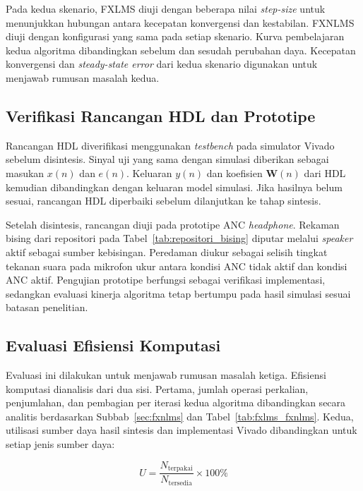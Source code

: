 Pada kedua skenario, FXLMS diuji dengan beberapa nilai \emph{step-size} untuk menunjukkan hubungan antara kecepatan konvergensi dan kestabilan. FXNLMS diuji dengan konfigurasi yang sama pada setiap skenario. Kurva pembelajaran kedua algoritma dibandingkan sebelum dan sesudah perubahan daya. Kecepatan konvergensi dan \emph{steady-state error} dari kedua skenario digunakan untuk menjawab rumusan masalah kedua.

\subsection{Verifikasi Rancangan HDL dan Prototipe}
\label{sec:verifikasi}

Rancangan HDL diverifikasi menggunakan \emph{testbench} pada simulator Vivado sebelum disintesis. Sinyal uji yang sama dengan simulasi diberikan sebagai masukan $x(n)$ dan $e(n)$. Keluaran $y(n)$ dan koefisien $\mathbf{W}(n)$ dari HDL kemudian dibandingkan dengan keluaran model simulasi. Jika hasilnya belum sesuai, rancangan HDL diperbaiki sebelum dilanjutkan ke tahap sintesis.

Setelah disintesis, rancangan diuji pada prototipe ANC \emph{headphone}. Rekaman bising dari repositori pada Tabel~\ref{tab:repositori_bising} diputar melalui \emph{speaker} aktif sebagai sumber kebisingan. Peredaman diukur sebagai selisih tingkat tekanan suara pada mikrofon ukur antara kondisi ANC tidak aktif dan kondisi ANC aktif. Pengujian prototipe berfungsi sebagai verifikasi implementasi, sedangkan evaluasi kinerja algoritma tetap bertumpu pada hasil simulasi sesuai batasan penelitian.

\subsection{Evaluasi Efisiensi Komputasi}
\label{sec:uji_efisiensi}

Evaluasi ini dilakukan untuk menjawab rumusan masalah ketiga. Efisiensi komputasi dianalisis dari dua sisi. Pertama, jumlah operasi perkalian, penjumlahan, dan pembagian per iterasi kedua algoritma dibandingkan secara analitis berdasarkan Subbab~\ref{sec:fxnlms} dan Tabel~\ref{tab:fxlms_fxnlms}. Kedua, utilisasi sumber daya hasil sintesis dan implementasi Vivado dibandingkan untuk setiap jenis sumber daya:

\begin{equation}
  \label{eq:3_3}
  U = \frac{N_{\text{terpakai}}}{N_{\text{tersedia}}} \times 100\%
\end{equation}

